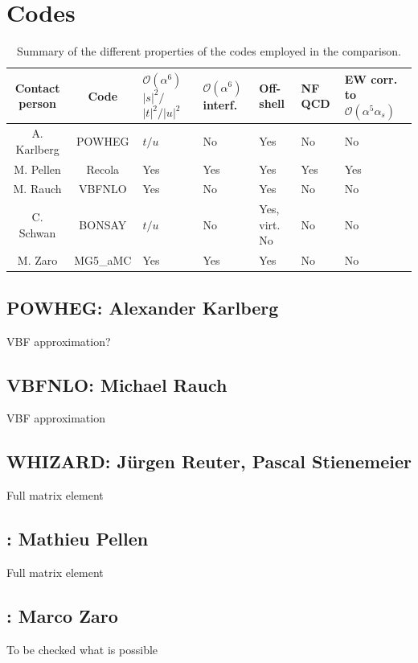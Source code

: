 \documentclass[a4paper,10pt]{report}
\begin{document}
\section{Codes}
\begin{table}
    \footnotesize
    \begin{tabularx}{\textwidth}{c|c|X|X|X|X|X}
        Contact person  &  Code  &  $\mathcal O(\alpha^6)$ $|s|^2/$ $|t|^2/|u|^2$  &  $\mathcal O(\alpha^6)$ interf.  &  Off-shell  &  NF QCD  &  EW corr. to $\mathcal O(\alpha^5\alpha_s)$  \\
        \hline
        \hline
        A. Karlberg  &  {\sc POWHEG}  &  $t/u$  &  No  &  Yes  &  No  &  No  \\
        M. Pellen    &  {\sc Recola}  &  Yes  &  Yes  &  Yes  &  Yes  &  Yes  \\
        M. Rauch     &  {\sc VBFNLO}  &  Yes  &  No  &  Yes  &  No  &  No  \\
        C. Schwan    &  {\sc BONSAY}  &  $t/u$  &  No  &  Yes, virt. No  &  No  &  No  \\
        M. Zaro      &  {\sc MG5\_aMC}  &  Yes  &  Yes  &  Yes  &  No  &  No
    \end{tabularx}
    \caption{\label{tab:codes} Summary of the different properties of the codes employed in the comparison.}
\end{table}

\subsection{ {\sc POWHEG}: Alexander Karlberg}
VBF approximation? \\
\subsection{ {\sc VBFNLO}: Michael Rauch}
VBF approximation \\
\subsection{ {\sc WHIZARD}: J\"urgen Reuter, Pascal Stienemeier}
Full matrix element \\
\subsection{ \recola: Mathieu Pellen}
Full matrix element \\
\subsection{ \madgraph: Marco Zaro}
To be checked what is possible \\
\end{document}
